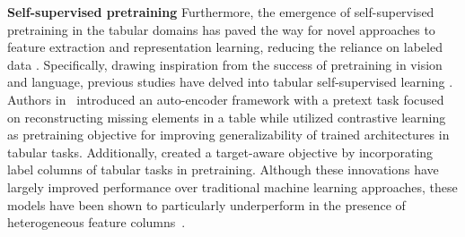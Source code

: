 \noindent \textbf{Self-supervised pretraining} 
Furthermore, the emergence of self-supervised pretraining in the tabular domains has paved the way for novel approaches to feature extraction and representation learning, reducing the reliance on labeled data \cite{liu2021self}. Specifically, drawing inspiration from the success of pretraining in vision and language, previous studies have delved into tabular self-supervised learning \cite{yoon2020vime, ucar2021subtab, somepalli2021saint, bahri2021scarf, majmundar2022met, rubachev2022revisiting, wang2022transtab}. 
Authors in~\cite{yoon2020vime, ucar2021subtab} introduced an auto-encoder framework with a pretext task focused on reconstructing missing elements in a table while \cite{bahri2021scarf} utilized contrastive learning~\cite{chen2020simple} as pretraining objective for improving generalizability of trained architectures in tabular tasks. 
Additionally, \cite{rubachev2022revisiting, wang2022transtab} created a target-aware objective by incorporating label columns of tabular tasks in pretraining. 
Although these innovations have largely improved performance over traditional machine learning approaches, these models have been shown to particularly underperform in the presence of heterogeneous feature columns~\cite{tabllm}.

